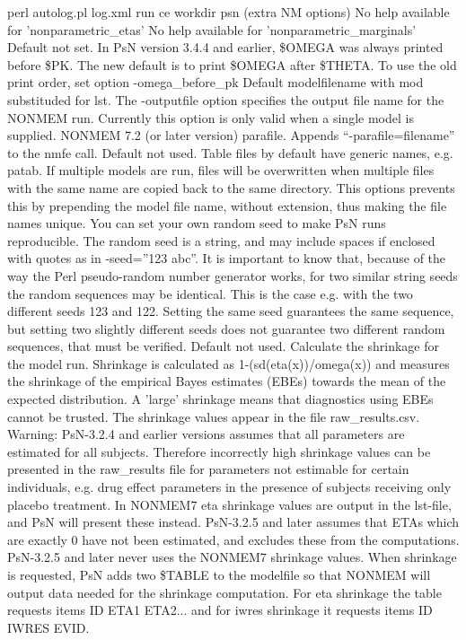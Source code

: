 \begin{optionlist}
perl autolog.pl log.xml run ce workdir psn (extra NM options)
\nextopt
{}
No help available for 'nonparametric\_etas' 
\nextopt
{}
No help available for 'nonparametric\_marginals' 
\nextopt
{}
Default not set. In PsN version 3.4.4 and earlier, \$OMEGA was always printed before \$PK. The new default is to print \$OMEGA after \$THETA. To use the old print order, set option -omega\_before\_pk 
\nextopt
{}
Default modelfilename with mod substituded for lst. The -outputfile option specifies the output file name for the NONMEM run. Currently this option is only valid when a single model is supplied. 
\nextopt
{}
NONMEM 7.2 (or later version) parafile. Appends “-parafile=filename” to the nmfe call. 
\nextopt
{}
Default not used. Table files by default have generic names, e.g. patab. If multiple models are run, files will be overwritten when multiple files with the same name are copied back to the same directory. This options prevents this by prepending the model file name, without extension, thus making the file names unique. 
\nextopt
{}
You can set your own random seed to make PsN runs reproducible.
The random seed is a string, and may include spaces if enclosed with
quotes as in -seed=''123 abc''. It is important to know that, because of the way the Perl pseudo-random
number generator works, for two similar string seeds the random sequences may be identical. 
This is the case e.g. with the two different seeds 123 and 122. 
Setting the same seed guarantees the same sequence, but setting two slightly different 
seeds does not guarantee two different random sequences, that must be verified.
\nextopt
{}
Default not used. Calculate the shrinkage for the model run.  Shrinkage is calculated as 1-(sd(eta(x))/omega(x)) and measures the shrinkage of the empirical Bayes estimates (EBEs) towards the mean of the expected distribution.  A 'large' shrinkage means that diagnostics using EBEs cannot be trusted. The shrinkage values appear in the file raw\_results.csv. Warning: PsN-3.2.4 and earlier versions assumes that all parameters are estimated for all subjects. Therefore incorrectly high shrinkage values can be presented in the raw\_results file for parameters not estimable for certain individuals, e.g. drug effect parameters in the presence of subjects receiving only placebo treatment. In NONMEM7 eta shrinkage values are output in the lst-file, and PsN will present these instead. PsN-3.2.5 and later assumes that ETAs which are exactly 0 have not been estimated, and excludes these from the computations. PsN-3.2.5 and later never uses the NONMEM7 shrinkage values. When shrinkage is requested, PsN adds two \$TABLE to the modelfile so that NONMEM will output data needed for the shrinkage computation. For eta shrinkage the table requests items ID ETA1 ETA2... and for iwres shrinkage it requests items ID IWRES EVID. 

\end{optionlist}

